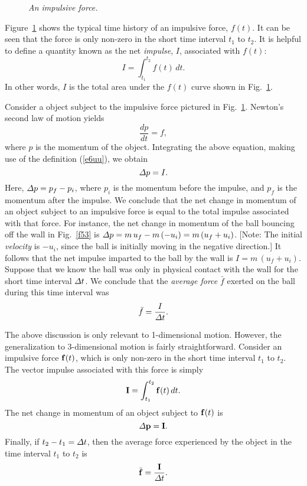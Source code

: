 \begin{figure}
\epsfysize=2.5in
\centerline{}
\caption{\em An impulsive force.}\label{f54}  
\end{figure}

Figure~\ref{f54} shows the typical time history of an impulsive force, $f(t)$. It can be seen that
the force is only non-zero in the short time interval $t_1$ to $t_2$. It is helpful
to define a quantity known as the net {\em impulse}, $I$, associated with $f(t)$:
\begin{equation}\label{e6uu}
I = \int_{t_1}^{t_2} f(t)\,dt.
\end{equation}
In other words, $I$ is the total area under the $f(t)$ curve shown in Fig.~\ref{f54}. 

Consider a object subject to the impulsive force pictured in Fig.~\ref{f54}. Newton's
second law of motion yields
\begin{equation}
\frac{dp}{dt} = f,
\end{equation}
where $p$ is the momentum of the object. Integrating the above equation, making use of
the definition (\ref{e6uu}), we obtain
\begin{equation}
{\mit\Delta}p = I.
\end{equation}
Here, ${\mit\Delta} p = p_f-p_i$, where $p_i$ is the momentum before the impulse, and
$p_f$ is the momentum after the impulse. We conclude that the net change in momentum of
an object subject to an impulsive force is equal to the  total impulse associated with that
force. For instance, the net change in momentum of the ball bouncing off the wall in
Fig.~\ref{f53} is ${\mit\Delta} p = m\,u_f -m\,(-u_i)=
m\,(u_f+u_i)$. [Note: The initial {\em velocity} is $-u_i$, since the ball is initially
moving in the negative direction.]
It follows that the net impulse imparted
to the ball by the wall is $I = m\,(u_f+u_i)$. Suppose that we know the ball was only in physical
contact with the wall for the short time interval ${\mit\Delta} t$. We conclude that the
{\em average force} $\bar{f}$ exerted on the ball during this time interval
was
\begin{equation}
\bar{f} = \frac{I}{{\mit\Delta} t}.
\end{equation}

The above discussion is only relevant to 1-dimensional motion. However, the generalization
to 3-dimensional motion is fairly straightforward. Consider an impulsive force
${\bf f}(t)$, which is only non-zero in the short time interval $t_1$ to $t_2$.
The vector impulse associated with this force is simply
\begin{equation}
{\bf I} = \int_{t_1}^{t_2} {\bf f}(t)\,dt.
\end{equation}
The net change in momentum of an object subject to  ${\bf f}(t)$ is
\begin{equation}
{\mit\Delta} {\bf p} = {\bf I}.
\end{equation}
Finally, if $t_2-t_1={\mit\Delta} t$, then the average force experienced by the
object in the time interval $t_1$ to $t_2$ is 
\begin{equation}
\bar{\bf f} = \frac{{\bf I}}{{\mit\Delta}t}.
\end{equation}

